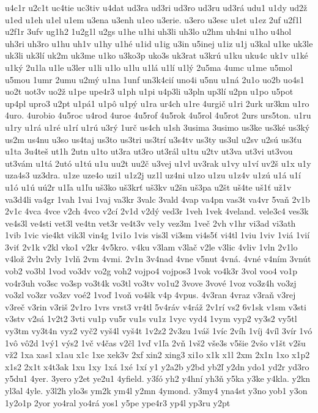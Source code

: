 {u4c1r
u2c1t
uc4tie
uc3tiv
u4dat
ud3ra
ud3ri
ud3ro
ud3ru
ud3rá
udu1
u1dy
ud2ž
u1ed
u1eh
u1el
u1em
u3ena
u3enh
u1eo
u3erie.
u3ero
u3esc
u1et
u1ez
2uf
u2f1l
u2f1r
3ufv
ug1h2
1u2g1l
u2gs
u1he
u1hi
uh3li
uh3lo
u2hm
uh4ni
u1ho
u4hol
uh3ri
uh3ro
u1hu
uh1v
u1hy
u1hé
u1id
u1ig
u3in
u5inej
u1iz
u1j
u3kal
u1ke
uk3le
uk3li
uk3lí
uk2m
uk3me
u1ko
u3ko3p
uko3s
uk3rat
u3krú
u1ku
uku4c
uk1v
u1ké
u1ký
2u1la
u1le
u3ler
u1li
u1lo
u1lu
u1lá
u1lí
u1lý
2u5ma
4umc
u1me
u5mol
u5mou
1umr
2umu
u2mý
u1na
1unf
un3k4cií
uno4i
u5nu
u1ná
2u1o
uo2b
uo4s1
uo2t
uot3v
uo2ž
u1pe
upe4r3
u1ph
u1pi
u4p3li
u3pln
up3lí
u2pn
u1po
u5pot
up4pl
upro3
u2pt
u1pá1
u1pô
u1pý
u1ra
ur4ch
u1re
4urgič
u1ri
2urk
ur3km
u1ro
4uro.
4urobio
4u5roc
u4rod
4uroe
4u5rof
4u5rok
4u5rol
4u5rot
2urs
urs5ton.
u1ru
u1ry
u1rá
u1ré
u1rí
u1rú
u3rý
1urč
us4ch
u1sh
3usima
3usimo
us3ke
us3ké
us3ký
us2m
us4nu
u3so
us4taj
us3to
us3tri
us3trí
u3s4tv
us3ty
us3ul
u2sv
u2sú
us3ťu
u1ta
3u4teš
ut1h
2utn
u1to
ut3ra
ut3ro
ut3rál
u1tu
u2tv
ut3va
ut3vi
ut3vou
ut3vám
u1tá
2utó
u1tú
u1u
uu2t
uu2č
u3vej
u1vl
uv3rak
u1vy
u1ví
uv2š
u1x
u1y
uza4s3
uz3dra.
u1ze
uze4o
uzi1
u1z2j
uz1l
uz4ni
u1zo
u1zu
u1z4v
u1zú
u1á
u1í
u1ó
u1ú
uú2r
u1ľa
u1ľu
uš3ko
uš3krť
uš3kv
u2šn
uš3pa
u2št
uš4te
uš1ť
už1v
va3d4li
va4gr
1vah
1vai
1vaj
va3kr
3valc
3vald
4vap
va4pn
vas3t
va4vr
5vaň
2v1b
2v1c
4vca
4vce
v2ch
4vco
v2cí
2v1d
v2dý
ved3r
1veh
1vek
4veland.
vele3c4
ves3k
ve4s3l
ve4sti
vet3l
ve4tn
vet3r
ve4t3v
ve1y
vez3m
1več
2vh
v1hr
vi3ad
vi3ath
1vib
1vic
vie4kt
vik3l
vin4g
1vi1o
1vis
vis3l
vi3sm
vi4s5ť
vi4tl
1viu
1viv
1viá
1vií
3viť
2v1k
v2kl
vko1
v2kr
4v5kro.
v4ku
v3lam
v3lač
v2le
v3lic
4vliv
1vln
2v1lo
v4lož
2vlu
2vly
1vlň
2vm
4vmi.
2v1n
3v4nad
4vne
v5nut
4vná.
4vné
v4ním
3vnút
vob2
vo3bl
1vod
vo3dv
vo2g
voh2
vojpo4
vojpos3
1vok
vo4k3r
3vol
voo4
vo1p
vo4r3uh
vo3sc
vo3sp
vo3t4k
vo3tl
vo3tv
vo1u2
3vove
3vové
1voz
vo3z4h
vo3zj
vo3zl
vo3zr
vo3zv
voé2
1voď
1voň
vo4šk
v4p
4vpus.
4v3ran
4vraz
v3raň
v3rej
v3reč
v3rin
v3riš
2v1ro
1vrs
vrst3
vr4tl
5v4ráv
v4ráž
2v1rí
vs2
6v1sk
v1sm
v3sti
v3stv
v2sá
1v2t2
3vti
vu1p
vu5r
vu1s
vu1z
1vyc
vyd4
1vym
vyp2
vy3s2
vy5tl
vy3tm
vy3t4n
vyz2
vyč2
vyš4l
vyš4t
1v2z2
2v3zu
1váš
1víc
2víh
1víj
4víl
3vír
1vó
1vô
vô2d
1vý1
výs2
1vč
v4čas
v2čl
1vď
v1ľa
2vň
1vš2
vše3s
v5šie
2všo
v1št
v2šu
vž2
1xa
xas1
x1au
x1c
1xe
xek3v
2xf
xin2
xing3
xi1o
x1k
x1l
2xm
2x1n
1xo
x1p2
x1s2
2x1t
x4t3ak
1xu
1xy
1xá
1xé
1xí
y1
y2a2b
y2bd
yb2ľ
y2dn
ydo1
yd2r
yd3ro
y5du1
4yer.
3yero
y2et
ye2u1
4yfield.
y3fó
yh2
y4hní
yh3ň
y5ka
y3ke
y4kla.
y2kn
yl3al
4yle.
y3l2h
ylo3s
ym2k
ym4l
y2mn
4ymond.
y3my4
yna4st
y3no
yob1
y3on
1y2o1p
2yor
yo4ral
yo4rá
yos1
y5pe
ype4r3
yp4l
yp3ru
y2pt
}
